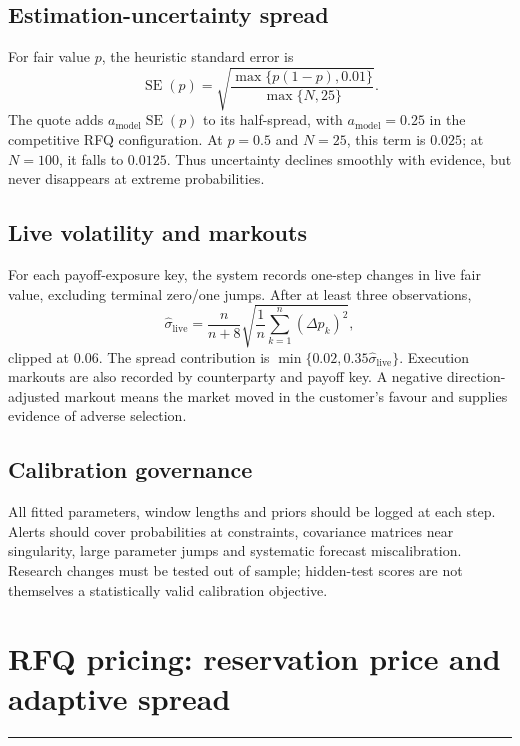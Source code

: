 \documentclass[10pt,a4paper]{article}
\newcommand{\1}{\mathbf{1}}
\newcommand{\sectionrule}{\vspace{-2pt}\noindent\color{navy}\rule{\textwidth}{0.7pt}\color{black}\vspace{2pt}}
\begin{document}
\subsection{Estimation-uncertainty spread}
For fair value $p$, the heuristic standard error is
\[
 \operatorname{SE}(p)=
 \sqrt{\frac{\max\{p(1-p),0.01\}}{\max\{N,25\}}}.
\]
The quote adds $a_{\mathrm{model}}\operatorname{SE}(p)$ to its half-spread, with
$a_{\mathrm{model}}=0.25$ in the competitive RFQ configuration.  At $p=0.5$ and
$N=25$, this term is $0.025$; at $N=100$, it falls to $0.0125$.  Thus uncertainty
declines smoothly with evidence, but never disappears at extreme probabilities.

\subsection{Live volatility and markouts}
For each payoff-exposure key, the system records one-step changes in live fair value,
excluding terminal zero/one jumps.  After at least three observations,
\[
 \widehat\sigma_{\mathrm{live}}
 =\frac{n}{n+8}\sqrt{\frac1n\sum_{k=1}^{n}(\Delta p_k)^2},
\]
clipped at $0.06$.  The spread contribution is
$\min\{0.02,0.35\widehat\sigma_{\mathrm{live}}\}$.  Execution markouts are also
recorded by counterparty and payoff key.  A negative direction-adjusted markout means
the market moved in the customer's favour and supplies evidence of adverse selection.

\subsection{Calibration governance}
All fitted parameters, window lengths and priors should be logged at each step.  Alerts
should cover probabilities at constraints, covariance matrices near singularity,
large parameter jumps and systematic forecast miscalibration.  Research changes must
be tested out of sample; hidden-test scores are not themselves a statistically valid
calibration objective.

\clearpage

\section{RFQ pricing: reservation price and adaptive spread}
\sectionrule
\end{document}
